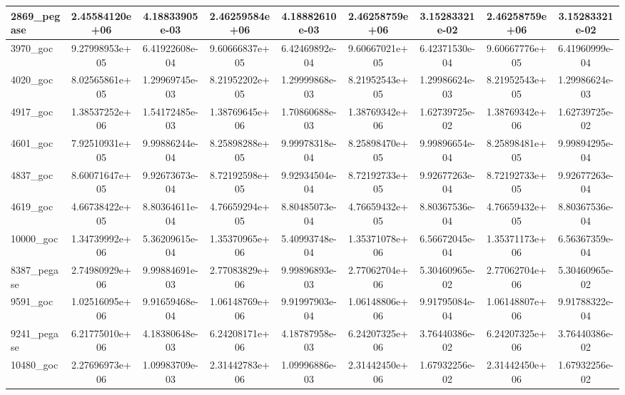 \begin{tabular}{|l|cc|cc|cc|cc|}
2869\_pegase 
& 2.45584120e+06
& 4.18833905e-03
& 2.46259584e+06
& 4.18882610e-03
& 2.46258759e+06
& 3.15283321e-02
& 2.46258759e+06
& 3.15283321e-02
\\
\hline
3970\_goc 
& 9.27998953e+05
& 6.41922608e-04
& 9.60666837e+05
& 6.42469892e-04
& 9.60667021e+05
& 6.42371530e-04
& 9.60667776e+05
& 6.41960999e-04
\\

4020\_goc 
& 8.02565861e+05
& 1.29969745e-03
& 8.21952202e+05
& 1.29999868e-03
& 8.21952543e+05
& 1.29986624e-03
& 8.21952543e+05
& 1.29986624e-03
\\

4917\_goc 
& 1.38537252e+06
& 1.54172485e-03
& 1.38769645e+06
& 1.70860688e-03
& 1.38769342e+06
& 1.62739725e-02
& 1.38769342e+06
& 1.62739725e-02
\\

4601\_goc 
& 7.92510931e+05
& 9.99886244e-04
& 8.25898288e+05
& 9.99978318e-04
& 8.25898470e+05
& 9.99896654e-04
& 8.25898481e+05
& 9.99894295e-04
\\

4837\_goc 
& 8.60071647e+05
& 9.92673673e-04
& 8.72192598e+05
& 9.92934504e-04
& 8.72192733e+05
& 9.92677263e-04
& 8.72192733e+05
& 9.92677263e-04
\\
\hline
4619\_goc 
& 4.66738422e+05
& 8.80364611e-04
& 4.76659294e+05
& 8.80485073e-04
& 4.76659432e+05
& 8.80367536e-04
& 4.76659432e+05
& 8.80367536e-04
\\

10000\_goc 
& 1.34739992e+06
& 5.36209615e-04
& 1.35370965e+06
& 5.40993748e-04
& 1.35371078e+06
& 6.56672045e-04
& 1.35371173e+06
& 6.56367359e-04
\\

8387\_pegase 
& 2.74980929e+06
& 9.99884691e-03
& 2.77083829e+06
& 9.99896893e-03
& 2.77062704e+06
& 5.30460965e-02
& 2.77062704e+06
& 5.30460965e-02
\\

9591\_goc 
& 1.02516095e+06
& 9.91659468e-04
& 1.06148769e+06
& 9.91997903e-04
& 1.06148806e+06
& 9.91795084e-04
& 1.06148807e+06
& 9.91788322e-04
\\

9241\_pegase 
& 6.21775010e+06
& 4.18380648e-03
& 6.24208171e+06
& 4.18787958e-03
& 6.24207325e+06
& 3.76440386e-02
& 6.24207325e+06
& 3.76440386e-02
\\
\hline
10480\_goc 
& 2.27696973e+06
& 1.09983709e-03
& 2.31442783e+06
& 1.09996886e-03
& 2.31442450e+06
& 1.67932256e-02
& 2.31442450e+06
& 1.67932256e-02
\\


\end{tabular}
